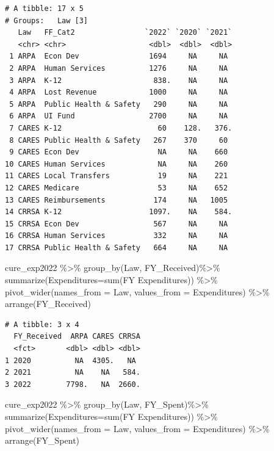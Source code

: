 \documentclass[
  letterpaper,
  DIV=11,
  numbers=noendperiod]{scrreport}
\newenvironment{Shaded}{\begin{snugshade}}{\end{snugshade}}
\newcommand{\AttributeTok}[1]{\textcolor[rgb]{0.40,0.45,0.13}{#1}}
\newcommand{\FunctionTok}[1]{\textcolor[rgb]{0.28,0.35,0.67}{#1}}
\newcommand{\NormalTok}[1]{\textcolor[rgb]{0.00,0.23,0.31}{#1}}
\newcommand{\SpecialCharTok}[1]{\textcolor[rgb]{0.37,0.37,0.37}{#1}}
\newcommand{\StringTok}[1]{\textcolor[rgb]{0.13,0.47,0.30}{#1}}
\begin{document}
\begin{verbatim}
# A tibble: 17 x 5
# Groups:   Law [3]
   Law   FF_Cat2                `2022` `2020` `2021`
   <chr> <chr>                   <dbl>  <dbl>  <dbl>
 1 ARPA  Econ Dev                1694     NA     NA 
 2 ARPA  Human Services          1276     NA     NA 
 3 ARPA  K-12                     838.    NA     NA 
 4 ARPA  Lost Revenue            1000     NA     NA 
 5 ARPA  Public Health & Safety   290     NA     NA 
 6 ARPA  UI Fund                 2700     NA     NA 
 7 CARES K-12                      60    128.   376.
 8 CARES Public Health & Safety   267    370     60 
 9 CARES Econ Dev                  NA     NA    660 
10 CARES Human Services            NA     NA    260 
11 CARES Local Transfers           19     NA    221 
12 CARES Medicare                  53     NA    652 
13 CARES Reimbursements           174     NA   1005 
14 CRRSA K-12                    1097.    NA    584.
15 CRRSA Econ Dev                 567     NA     NA 
16 CRRSA Human Services           332     NA     NA 
17 CRRSA Public Health & Safety   664     NA     NA 
\end{verbatim}

\begin{Shaded}
\begin{Highlighting}[]
\NormalTok{cure\_exp2022 }\SpecialCharTok{\%\textgreater{}\%} 
  \FunctionTok{group\_by}\NormalTok{(Law, FY\_Received)}\SpecialCharTok{\%\textgreater{}\%} 
  \FunctionTok{summarize}\NormalTok{(}\AttributeTok{Expenditures=}\FunctionTok{sum}\NormalTok{(}\StringTok{\textasciigrave{}}\AttributeTok{FY Expenditures}\StringTok{\textasciigrave{}}\NormalTok{)) }\SpecialCharTok{\%\textgreater{}\%}
  \FunctionTok{pivot\_wider}\NormalTok{(}\AttributeTok{names\_from =}\NormalTok{ Law, }\AttributeTok{values\_from =}\NormalTok{ Expenditures) }\SpecialCharTok{\%\textgreater{}\%} \FunctionTok{arrange}\NormalTok{(FY\_Received)}
\end{Highlighting}
\end{Shaded}

\begin{verbatim}
# A tibble: 3 x 4
  FY_Received  ARPA CARES CRRSA
  <fct>       <dbl> <dbl> <dbl>
1 2020          NA  4305.   NA 
2 2021          NA    NA   584.
3 2022        7798.   NA  2660.
\end{verbatim}

\begin{Shaded}
\begin{Highlighting}[]
\NormalTok{cure\_exp2022 }\SpecialCharTok{\%\textgreater{}\%} 
  \FunctionTok{group\_by}\NormalTok{(Law, FY\_Spent)}\SpecialCharTok{\%\textgreater{}\%} 
  \FunctionTok{summarize}\NormalTok{(}\AttributeTok{Expenditures=}\FunctionTok{sum}\NormalTok{(}\StringTok{\textasciigrave{}}\AttributeTok{FY Expenditures}\StringTok{\textasciigrave{}}\NormalTok{)) }\SpecialCharTok{\%\textgreater{}\%}
  \FunctionTok{pivot\_wider}\NormalTok{(}\AttributeTok{names\_from =}\NormalTok{ Law, }\AttributeTok{values\_from =}\NormalTok{ Expenditures) }\SpecialCharTok{\%\textgreater{}\%}
  \FunctionTok{arrange}\NormalTok{(FY\_Spent)}
\end{Highlighting}
\end{Shaded}
\end{document}
